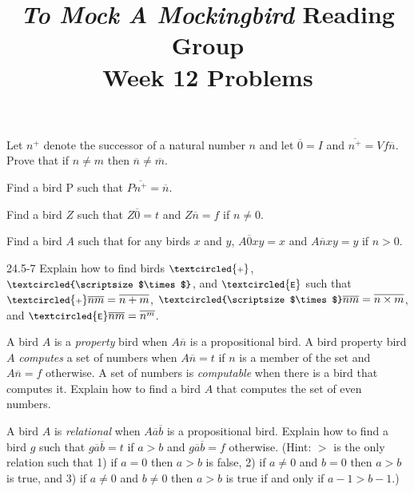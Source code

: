 \documentclass[12pt, letterpaper]{article}
\title{\emph{To Mock A Mockingbird} Reading Group\\Week 12 Problems}
\begin{document}
\maketitle

\begin{prob}{24.1}
Let $n^+$ denote the successor of a natural number $n$ and let $\overline{0} = I$ and $\overline{n^+} = Vf\overline{n}$. Prove that if $n \neq m$ then $\overline{n} \neq \overline{m}$. 
\end{prob}

\begin{prob}{24.2}
Find a bird P such that $P\overline{n^+} = \overline{n}$.
\end{prob}

\begin{prob}{24.3}
Find a bird $Z$ such that $Z\overline{0} = t$ and $Z\overline{n} = f$ if $n \neq 0$. 
\end{prob}

\begin{prob}{24.4}
Find a bird $A$ such that for any birds $x$ and $y$, $A\overline{0}xy = x$ and $A\overline{n}xy = y$ if $n > 0$. 
\end{prob}

\begin{prob}{24.5-7}
Explain how to find birds $\small \textcircled{\scriptsize \textsf{+}}$, $\small \textcircled{\scriptsize $\times$}$, and $\small \textcircled{\scriptsize \textsf{E}}$ such that $\small \textcircled{\scriptsize \textsf{+}} \overline{n} \overline{m} = \overline{n + m}$, $\small \textcircled{\scriptsize $\times$}\overline{n}\overline{m} = \overline{n \times m}$, and $\small \textcircled{\scriptsize \textsf{E}}\overline{n}\overline{m} = \overline{n^m}$.
\end{prob}

\begin{prob}{24.8}
A bird $A$ is a \emph{property} bird when $A\overline{n}$ is a propositional bird. A bird property bird $A$ \emph{computes} a set of numbers when $A\overline{n} = t$ if $n$ is a member of the set and $A\overline{n} = f$ otherwise. A set of numbers is \emph{computable} when there is a bird that computes it. Explain how to find a bird $A$ that computes the set of even numbers.
\end{prob}

\begin{prob}{24.9}
A bird $A$ is \emph{relational} when $A\overline{a}\overline{b}$ is a propositional bird. Explain how to find a bird $g$ such that $g\overline{a}\overline{b} = t$ if $a > b$ and $g\overline{a}\overline{b} = f$ otherwise. (Hint: $>$ is the only relation such that 1) if $a = 0$ then $a > b$ is false, 2) if $a \neq 0$ and $b = 0$ then $a > b$ is true, and 3) if $a \neq 0$ and $b \neq 0$ then $a > b$ is true if and only if $a - 1 > b - 1$.)
\end{prob}
\end{document}
